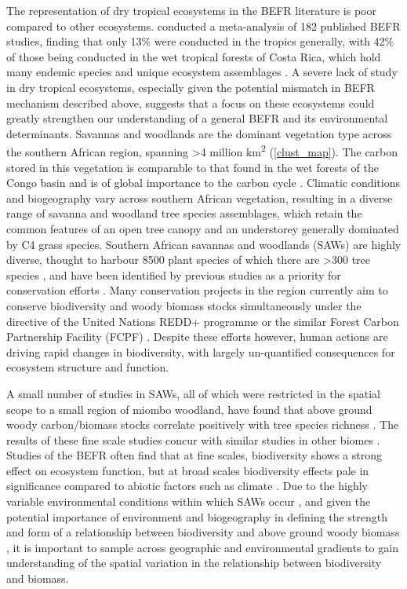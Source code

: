 \documentclass[11pt,a4paper]{article}
\newcommand{\textapprox}{\raisebox{0.5ex}{\texttildelow}}  %
\begin{document}
The representation of dry tropical ecosystems in the BEFR literature is poor compared to other ecosystems. \citet{Clarke2017} conducted a meta-analysis of 182 published BEFR studies, finding that only 13\% were conducted in the tropics generally, with 42\% of those being conducted in the wet tropical forests of Costa Rica, which hold many endemic species and unique ecosystem assemblages \citep{Barthlott2005}. A severe lack of study in dry tropical ecosystems, especially given the potential mismatch in BEFR mechanism described above, suggests that a focus on these ecosystems could greatly strengthen our understanding of a general BEFR and its environmental determinants. Savannas and woodlands are the dominant vegetation type across the southern African region, spanning >4 million km\textsuperscript{2} \citep{White1987, Ratnam2011, Ryan2016} (\autoref{clust_map}). The carbon stored in this vegetation is comparable to that found in the wet forests of the Congo basin and is of global importance to the carbon cycle \citep{Houghton2009, Mayaux2008}. Climatic conditions and biogeography vary across southern African vegetation, resulting in a diverse range of savanna and woodland tree species assemblages, which retain the common features of an open tree canopy and an understorey generally dominated by C4 grass species. Southern African savannas and woodlands (SAWs) are highly diverse, thought to harbour \textapprox{}8500 plant species of which there are >300 tree species \citep{Frost1996}, and have been identified by previous studies as a priority for conservation efforts \citep{Byers2001, Mittermeier2003}. Many conservation projects in the region currently aim to conserve biodiversity and woody biomass stocks simultaneously under the directive of the United Nations REDD+ programme or the similar Forest Carbon Partnership Facility (FCPF) \citep{Hinsley2015}. Despite these efforts however, human actions are driving rapid changes in biodiversity, with largely un-quantified consequences for ecosystem structure and function.

A small number of studies in SAWs, all of which were restricted in the spatial scope to a small region of miombo woodland, have found that above ground woody carbon/biomass stocks correlate positively with tree species richness \citep{McNicol2018, Shirima2015, Mutowo2012}. The results of these fine scale studies concur with similar studies in other biomes \citep{}. Studies of the BEFR often find that at fine scales, biodiversity shows a strong effect on ecosystem function, but at broad scales biodiversity effects pale in significance compared to abiotic factors such as climate \citep{Pasari2013}. Due to the highly variable environmental conditions within which SAWs occur \citep{Frost1996},  and given the potential importance of environment and biogeography in defining the strength and form of a relationship between biodiversity and above ground woody biomass \citep{}, it is important to sample across geographic and environmental gradients to gain understanding of the spatial variation in the relationship between biodiversity and biomass. 
\end{document}
